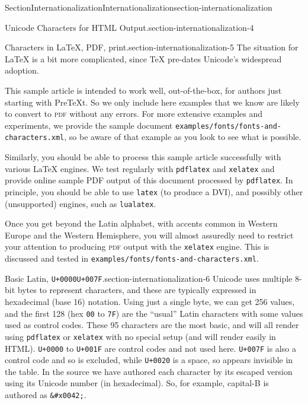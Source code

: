 \documentclass[twoside,10pt,]{article}
\newcommand{\mono}[1]{\texttt{#1}}
\newcommand{\initialism}[1]{\textsc{\MakeLowercase{#1}}}
\numberwithin{equation}{section}
\begin{document}
\begin{sectionptx}{Section}{Internationalization}{}{Internationalization}{}{}{section-internationalization}
\begin{paragraphs}{Unicode Characters for HTML Output.}{section-internationalization-4}
\begin{itemize}[label=\textbullet]
\end{itemize}
%
\end{paragraphs}%
\begin{paragraphs}{Characters in \LaTeX{}, PDF, print.}{section-internationalization-5}%
The situation for \LaTeX{} is a bit more complicated, since \TeX{} pre-dates Unicode's widespread adoption.%
\par
This sample article is intended to work well, out-of-the-box, for authors just starting with PreTeXt.  So we only include here examples that we know are likely to convert to \initialism{PDF} without any errors.  For more extensive examples and experiments, we provide the sample document \mono{examples/fonts/fonts-and-characters.xml}, so be aware of that example as you look to see what is possible.%
\par
Similarly, you should be able to process this sample article successfully with various \LaTeX{} engines.  We test regularly with \mono{pdflatex} and \mono{xelatex} and provide online sample PDF output of this document processed by \mono{pdflatex}.  In principle, you should be able to use \mono{latex} (to produce a DVI), and possibly other (unsupported) engines, such as \mono{lualatex}.%
\par
Once you get beyond the Latin alphabet, with accents common in Western Europe and the Western Hemisphere, you will almost assuredly need to restrict your attention to producing \initialism{PDF} output with the \mono{xelatex} engine.  This is discussed and tested in \mono{examples/fonts/fonts-and-characters.xml}.%
\end{paragraphs}%
\begin{paragraphs}{Basic Latin, \mono{U+0000}\textendash{}\mono{U+007F}.}{section-internationalization-6}%
Unicode uses multiple 8-bit bytes to represent characters, and these are typically expressed in hexadecimal (base 16) notation.  Using just a single byte, we can get 256 values, and the first 128 (hex \mono{00} to \mono{7F}) are the ``usual'' Latin characters with some values used as control codes.  These 95 characters are the most basic, and will all render using \mono{pdflatex} or \mono{xelatex} with no special setup (and will render easily in HTML).  \mono{U+0000} to \mono{U+001F} are control codes and not used here.  \mono{U+007F} is also a control code and so is excluded, while \mono{U+0020} is a space, so appears invisible in the table.  In the source we have authored each character by its escaped version using its Unicode number (in hexadecimal).  So, for example, capital-B is authored as \mono{\&\#x0042;}.%

\end{paragraphs}
\end{sectionptx}
\end{document}
